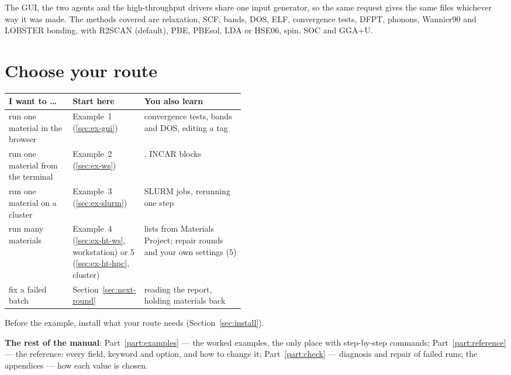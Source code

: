 \documentclass[11pt,a4paper]{scrartcl}
\newcommand{\thead}{\rowcolor{lightblue}}
\newcommand{\cmd}[1]{\texttt{\detokenize{#1}}}
\begin{document}
\medskip\noindent The GUI, the two agents and the high-throughput drivers share one input
generator, so the same request gives the same files whichever way it was made.  The methods
covered are relaxation, SCF, bands, DOS, ELF, convergence tests, DFPT, phonons, Wannier90 and
LOBSTER bonding, with R2SCAN (default), PBE, PBEsol, LDA or HSE06, spin, SOC and GGA+U.

\section{Choose your route}
\label{sec:start}

\medskip\noindent\begin{tabularx}{\linewidth}{@{}>{\raggedright\arraybackslash}p{0.27\linewidth}>{\raggedright\arraybackslash}p{0.2\linewidth}>{\raggedright\arraybackslash}X@{}}
\thead
I want to \ldots & Start here & You also learn \\ \midrule
run one material in the browser & Example~1 (\ref{sec:ex-gui}) & convergence tests, bands and DOS, editing a tag \\
run one material from the terminal & Example~2 (\ref{sec:ex-ws}) & \cmd{instructions.txt}, INCAR blocks \\
run one material on a cluster & Example~3 (\ref{sec:ex-slurm}) & SLURM jobs, rerunning one step \\
run many materials & Example~4 (\ref{sec:ex-ht-ws}, workstation) or 5 (\ref{sec:ex-ht-hpc}, cluster) &
  lists from Materials Project; repair rounds and your own settings (5) \\
fix a failed batch & Section~\ref{sec:next-round} & reading the report, holding materials back \\
\bottomrule
\end{tabularx}

\medskip\noindent Before the example, install what your route needs (Section~\ref{sec:install}).

\medskip\noindent\textbf{The rest of the manual}:
Part~\ref{part:examples} --- the worked examples, the only place with step-by-step commands;
Part~\ref{part:reference} --- the reference: every field, keyword and option, and how to
change it;
Part~\ref{part:check} --- diagnosis and repair of failed runs;
the appendices --- how each value is chosen.

\end{document}
